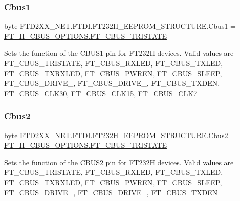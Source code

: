 \subsubsection{\texorpdfstring{Cbus1}{Cbus1}}
{\footnotesize\ttfamily byte F\+T\+D2\+X\+X\+\_\+\+N\+E\+T.\+F\+T\+D\+I.\+F\+T232\+H\+\_\+\+E\+E\+P\+R\+O\+M\+\_\+\+S\+T\+R\+U\+C\+T\+U\+R\+E.\+Cbus1 = \mbox{\hyperlink{class_f_t_d2_x_x___n_e_t_1_1_f_t_d_i_1_1_f_t__232_h___c_b_u_s___o_p_t_i_o_n_s_a87f6bc339ec2e6bbb3ad093eb9d38278}{F\+T\+\_\+H\+\_\+\+C\+B\+U\+S\+\_\+\+O\+P\+T\+I\+O\+N\+S.\+F\+T\+\_\+\+C\+B\+U\+S\+\_\+\+T\+R\+I\+S\+T\+A\+TE}}}



Sets the function of the C\+B\+U\+S1 pin for F\+T232H devices. Valid values are F\+T\+\_\+\+C\+B\+U\+S\+\_\+\+T\+R\+I\+S\+T\+A\+TE, F\+T\+\_\+\+C\+B\+U\+S\+\_\+\+R\+X\+L\+ED, F\+T\+\_\+\+C\+B\+U\+S\+\_\+\+T\+X\+L\+ED, F\+T\+\_\+\+C\+B\+U\+S\+\_\+\+T\+X\+R\+X\+L\+ED, F\+T\+\_\+\+C\+B\+U\+S\+\_\+\+P\+W\+R\+EN, F\+T\+\_\+\+C\+B\+U\+S\+\_\+\+S\+L\+E\+EP, F\+T\+\_\+\+C\+B\+U\+S\+\_\+\+D\+R\+I\+V\+E\+\_, F\+T\+\_\+\+C\+B\+U\+S\+\_\+\+D\+R\+I\+V\+E\+\_, F\+T\+\_\+\+C\+B\+U\+S\+\_\+\+T\+X\+D\+EN, F\+T\+\_\+\+C\+B\+U\+S\+\_\+\+C\+L\+K30, F\+T\+\_\+\+C\+B\+U\+S\+\_\+\+C\+L\+K15, F\+T\+\_\+\+C\+B\+U\+S\+\_\+\+C\+L\+K7\+\_ 

\mbox{\label{class_f_t_d2_x_x___n_e_t_1_1_f_t_d_i_1_1_f_t232_h___e_e_p_r_o_m___s_t_r_u_c_t_u_r_e_a8fbe38510a9b6e917a8ee0fd84121763}} 
\subsubsection{\texorpdfstring{Cbus2}{Cbus2}}
{\footnotesize\ttfamily byte F\+T\+D2\+X\+X\+\_\+\+N\+E\+T.\+F\+T\+D\+I.\+F\+T232\+H\+\_\+\+E\+E\+P\+R\+O\+M\+\_\+\+S\+T\+R\+U\+C\+T\+U\+R\+E.\+Cbus2 = \mbox{\hyperlink{class_f_t_d2_x_x___n_e_t_1_1_f_t_d_i_1_1_f_t__232_h___c_b_u_s___o_p_t_i_o_n_s_a87f6bc339ec2e6bbb3ad093eb9d38278}{F\+T\+\_\+H\+\_\+\+C\+B\+U\+S\+\_\+\+O\+P\+T\+I\+O\+N\+S.\+F\+T\+\_\+\+C\+B\+U\+S\+\_\+\+T\+R\+I\+S\+T\+A\+TE}}}



Sets the function of the C\+B\+U\+S2 pin for F\+T232H devices. Valid values are F\+T\+\_\+\+C\+B\+U\+S\+\_\+\+T\+R\+I\+S\+T\+A\+TE, F\+T\+\_\+\+C\+B\+U\+S\+\_\+\+R\+X\+L\+ED, F\+T\+\_\+\+C\+B\+U\+S\+\_\+\+T\+X\+L\+ED, F\+T\+\_\+\+C\+B\+U\+S\+\_\+\+T\+X\+R\+X\+L\+ED, F\+T\+\_\+\+C\+B\+U\+S\+\_\+\+P\+W\+R\+EN, F\+T\+\_\+\+C\+B\+U\+S\+\_\+\+S\+L\+E\+EP, F\+T\+\_\+\+C\+B\+U\+S\+\_\+\+D\+R\+I\+V\+E\+\_, F\+T\+\_\+\+C\+B\+U\+S\+\_\+\+D\+R\+I\+V\+E\+\_, F\+T\+\_\+\+C\+B\+U\+S\+\_\+\+T\+X\+D\+EN 

